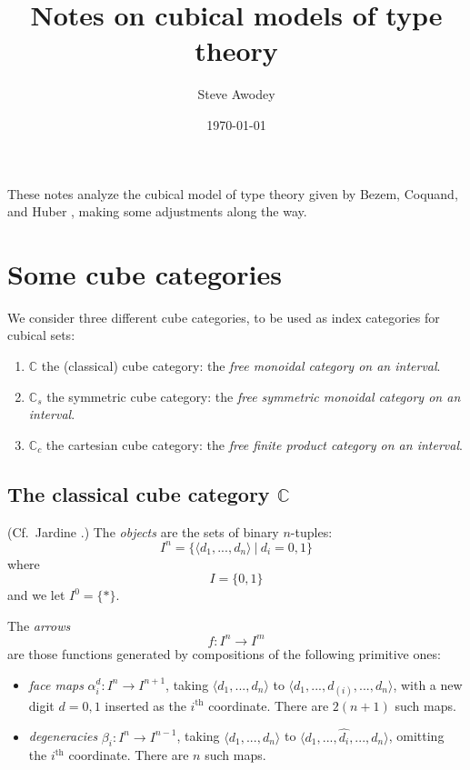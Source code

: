 \documentclass[11pt]{article}
\theoremstyle{remark}
\theoremstyle{definition}
\begin{document}

\title{Notes on cubical models of type theory}
\author{Steve Awodey}
\date{\today}

\maketitle
\noindent
These notes analyze the cubical model of type theory given by Bezem, Coquand, and Huber \cite{BCH}, making some adjustments along the way.

\section{Some cube categories}

We consider three different cube categories, to be used as index categories for cubical sets:

\begin{enumerate}
\item $\mathbb{C}$ the (classical) cube category: the \emph{free monoidal category on an interval}.
\item $\mathbb{C}_s$ the symmetric cube category: the \emph{free symmetric monoidal category on an interval}.
\item $\mathbb{C}_c$ the cartesian cube category: the \emph{free finite product category on an interval}.
\end{enumerate}

\subsection{The classical cube category $\mathbb{C}$}

(Cf.\ Jardine \cite{Jardine2001,Jardine2002}.)
The \emph{objects} are the sets of binary $n$-tuples:
\[
I^n = \{ \langle d_1, ..., d_n\rangle\ \vert\ d_i = 0,1\}
\]
where 
\[
I = \{ 0, 1\}
\]
and we let $I^0 = \{*\}$.

The \emph{arrows} $$f : I^n \to I^m$$ are those functions generated by compositions of the following primitive ones:
\begin{itemize}
\item \emph{face maps} $\alpha^{d}_{i} : I^n \to I^{n+1}$, taking $\langle d_1, ..., d_n\rangle$ to $\langle d_1, ..., d_{(i)}, ..., d_n\rangle$, with a new digit $d = 0,1$ inserted as the $i^{\mathrm{th}}$ coordinate. There are $2(n+1)$ such maps.

\item \emph{degeneracies} $\beta_{i} : I^n \to I^{n-1}$, taking $\langle d_1, ..., d_n\rangle$ to $\langle d_1, ..., \hat{d_{i}}, ..., d_n\rangle$, omitting the $i^{\mathrm{th}}$ coordinate.  There are $n$ such maps.
\end{itemize}
\end{document}
